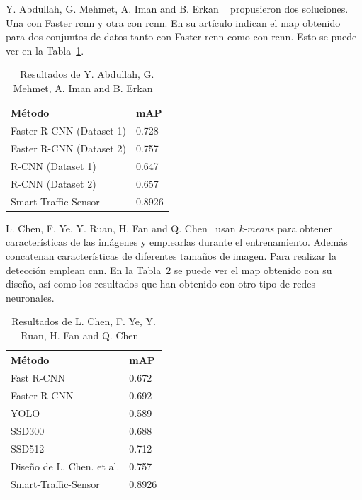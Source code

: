 Y. Abdullah, G. Mehmet, A. Iman and B. Erkan ~\cite{rcnn_detection} propusieron dos soluciones. Una con Faster \acrshort{rcnn} y otra con \acrshort{rcnn}. En su artículo indican el \acrshort{map} obtenido para dos conjuntos de datos tanto con Faster \acrshort{rcnn} como con \acrshort{rcnn}. Esto se puede ver en la Tabla~\ref{resultados_abdullah}.

\begin{table}[H] 
\begin{center}
\begin{tabular}{|l|l|}
\hline
Método & mAP  \\ 
\hline \hline
Faster R-CNN (Dataset 1) & 0.728  \\ \hline
Faster R-CNN (Dataset 2)  & 0.757 \\ \hline
R-CNN (Dataset 1) & 0.647  \\ \hline
R-CNN (Dataset 2)  & 0.657 \\ \hline
Smart-Traffic-Sensor & 0.8926 \\  \hline
\end{tabular}
\caption{Resultados de Y. Abdullah, G. Mehmet, A. Iman and B. Erkan ~\cite{rcnn_detection}}
\label{resultados_abdullah}
\end{center}
\end{table}

L. Chen, F. Ye, Y. Ruan, H. Fan and Q. Chen~\cite{l_chen} usan \textit{k-means} para obtener características de las imágenes y emplearlas durante el entrenamiento. Además concatenan características de diferentes tamaños de imagen. Para realizar la detección emplean \acrshort{cnn}. En la Tabla~\ref{resultados_lchen} se puede ver el \acrshort{map} obtenido con su diseño, así como los resultados que han obtenido con otro tipo de redes neuronales.

\begin{table}[H] 
\begin{center}
\begin{tabular}{|l|l|}
\hline
Método & mAP  \\ 
\hline \hline
Fast R-CNN & 0.672  \\ \hline
Faster R-CNN & 0.692 \\ \hline
YOLO & 0.589  \\ \hline
SSD300  & 0.688 \\ \hline
SSD512  & 0.712 \\ \hline
Diseño de L. Chen. et al. & 0.757 \\ \hline
Smart-Traffic-Sensor & 0.8926 \\  \hline
\end{tabular}
\caption{Resultados de L. Chen, F. Ye, Y. Ruan, H. Fan and Q. Chen ~\cite{l_chen}}
\label{resultados_lchen}
\end{center}
\end{table}

